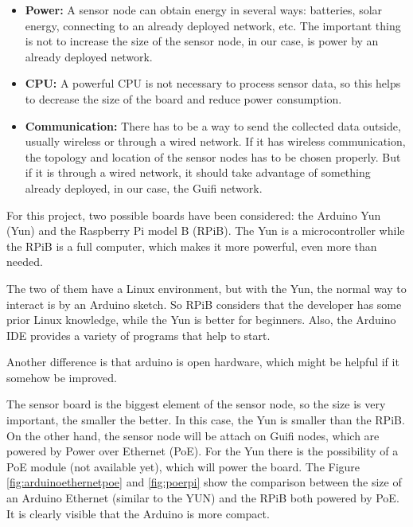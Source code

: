 \documentclass[12pt, a4paper,twoside]{tesi_upf}
\begin{document}
    \begin{itemize}
    	\item {\bf Power:} A sensor node can obtain energy in several ways: batteries, solar energy, connecting to an already deployed network, etc. The important thing is not to increase the size of the sensor node, in our case, is power by an already deployed network.
    	\item {\bf CPU:} A powerful CPU is not necessary to process sensor data, so this helps to decrease the size of the board and reduce power consumption.
    	\item {\bf Communication:} There has to be a way to send the collected data outside, usually wireless or through a wired network. If it has wireless communication, the topology and location of the sensor nodes has to be chosen properly. But if it is through a wired network, it should take advantage of something already deployed, in our case, the Guifi network.
    \end{itemize}
    
    For this project, two possible boards have been considered: the Arduino Yun (Yun) and the Raspberry Pi model B (RPiB). The Yun is a microcontroller while the RPiB is a full computer, which makes it more powerful, even more than needed.
    
    The two of them have a Linux environment, but with the Yun, the normal way to interact is by an Arduino sketch. So RPiB considers that the developer has some prior Linux knowledge, while the Yun is better for beginners. Also, the Arduino IDE provides a variety of programs that help to start.
    
    Another difference is that arduino is open hardware, which might be helpful if it somehow be improved.
    
    The sensor board is the biggest element of the sensor node, so the size is very important, the smaller the better. In this case, the Yun is smaller than the RPiB. On the other hand, the sensor node will be attach on Guifi nodes, which are powered by Power over Ethernet (PoE). 
    For the Yun there is the possibility of a PoE module (not available yet), which will power the board. The Figure \ref{fig:arduinoethernetpoe} and \ref{fig:poerpi} show the comparison between the size of an Arduino Ethernet (similar to the YUN) and the RPiB both powered by PoE. It is clearly visible that the Arduino is more compact.
    
\end{document}
